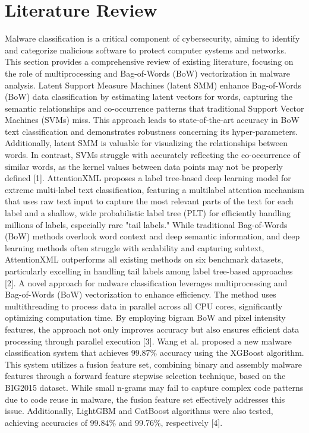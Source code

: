 \documentclass[conference]{IEEEtran}
\begin{document}
\section{Literature Review}
Malware classification is a critical component of cybersecurity, aiming to identify and categorize malicious software to protect computer systems and networks. This section provides a comprehensive review of existing literature, focusing on the role of multiprocessing and Bag-of-Words (BoW) vectorization in malware analysis.
Latent Support Measure Machines (latent SMM) enhance Bag-of-Words (BoW) data classification by estimating latent vectors for words, capturing the semantic relationships and co-occurrence patterns that traditional Support Vector Machines (SVMs) miss. This approach leads to state-of-the-art accuracy in BoW text classification and demonstrates robustness concerning its hyper-parameters. Additionally, latent SMM is valuable for visualizing the relationships between words. In contrast, SVMs struggle with accurately reflecting the co-occurrence of similar words, as the kernel values between data points may not be properly defined [1].
AttentionXML proposes a label tree-based deep learning model for extreme multi-label text classification, featuring a multilabel attention mechanism that uses raw text input to capture the most relevant parts of the text for each label and a shallow, wide probabilistic label tree (PLT) for efficiently handling millions of labels, especially rare "tail labels." While traditional Bag-of-Words (BoW) methods overlook word context and deep semantic information, and deep learning methods often struggle with scalability and capturing subtext, AttentionXML outperforms all existing methods on six benchmark datasets, particularly excelling in handling tail labels among label tree-based approaches [2].
A novel approach for malware classification leverages multiprocessing and Bag-of-Words (BoW) vectorization to enhance efficiency. The method uses multithreading to process data in parallel across all CPU cores, significantly optimizing computation time. By employing bigram BoW and pixel intensity features, the approach not only improves accuracy but also ensures efficient data processing through parallel execution [3].
Wang et al. proposed a new malware classification system that achieves 99.87\% accuracy using the XGBoost algorithm. This system utilizes a fusion feature set, combining binary and assembly malware features through a forward feature stepwise selection technique, based on the BIG2015 dataset. While small n-grams may fail to capture complex code patterns due to code reuse in malware, the fusion feature set effectively addresses this issue. Additionally, LightGBM and CatBoost algorithms were also tested, achieving accuracies of 99.84\% and 99.76\%, respectively [4].
\end{document}
